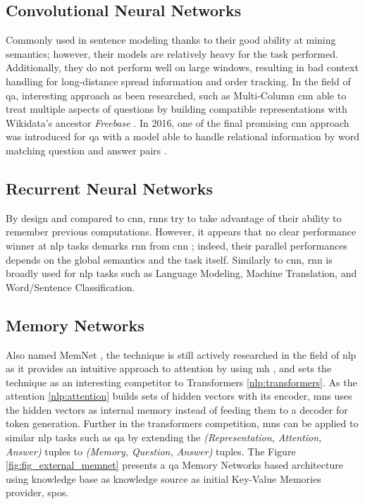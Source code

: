 \subsection{Convolutional Neural Networks}
Commonly used in sentence modeling thanks to their good ability at mining semantics; however, their models are relatively heavy for the task performed. Additionally, they do not perform well on large windows, resulting in bad context handling for long-distance spread information and order tracking. In the field of \gls{qa}, interesting approach as been researched, such as Multi-Column \gls{cnn} \autocite{paper:Dong2015} able to treat multiple aspects of questions by building compatible representations with Wikidata's ancestor \textit{Freebase} \autocite{paper:bollacker2008}. In 2016, one of the final promising \gls{cnn} approach was introduced for \gls{qa} with a model able to handle relational information by word matching question and answer pairs \autocite{paper:Severyn2016}.

\subsection{Recurrent Neural Networks}
 By design and compared to \gls{cnn}, \glspl{rnn} try to take advantage of their ability to remember previous computations. However, it appears that no clear performance winner at \gls{nlp} tasks demarks \gls{rnn} from \gls{cnn} \autocite{paper:Yin2017}; indeed, their parallel performances depends on the global semantics and the task itself. Similarly to \gls{cnn}, \gls{rnn} is broadly used for \gls{nlp} tasks such as Language Modeling, Machine Translation, and Word/Sentence Classification.

\subsection{Memory Networks}
Also named MemNet \autocite{paper:Weston2015MemoryN}, the technique is still actively researched in the field of \gls{nlp} as it provides an intuitive approach to attention by using \gls{mh} \autocite{paper:journals/corr/TangQL16}, and sets the technique as an interesting competitor to Transformers \ref{nlp:transformers}. As the \gls{attention} \ref{nlp:attention} builds sets of hidden vectors with its encoder, \glspl{mn} uses the hidden vectors as internal memory instead of feeding them to a decoder for token generation. Further in the \glspl{transformer} competition, \glspl{mn} can be applied to similar \gls{nlp} tasks such as \gls{qa} \autocite{paper:journals/corr/KumarISBEPOGS15} by extending the \textit{(Representation, Attention, Answer)} tuples to \textit{(Memory, Question, Answer)} tuples. The Figure \ref{fig:fig_external_memnet} presents a \gls{qa} Memory Networks based architecture using knowledge base as knowledge source as initial Key-Value Memories provider, \glspl{spo}.

